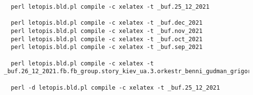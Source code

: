 
 
 
 
 
\begin{verbatim}
  perl letopis.bld.pl compile -c xelatex -t _buf.25_12_2021

  perl letopis.bld.pl compile -c xelatex -t _buf.dec_2021
  perl letopis.bld.pl compile -c xelatex -t _buf.nov_2021
  perl letopis.bld.pl compile -c xelatex -t _buf.oct_2021
  perl letopis.bld.pl compile -c xelatex -t _buf.sep_2021

  perl letopis.bld.pl compile -c xelatex -t _buf.26_12_2021.fb.fb_group.story_kiev_ua.3.orkestr_benni_gudman_grigorij_chapkis_1962

  perl -d letopis.bld.pl compile -c xelatex -t _buf.25_12_2021

\end{verbatim}
